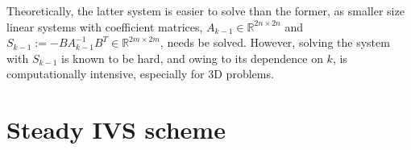 \documentclass[3p]{elsarticle}
\newcommand{\DY}[1]{{\color{black}{#1}}}
\begin{document}
Theoretically, the latter system is easier to solve than the former, as smaller size linear systems with coefficient matrices, $A_{k-1} \in \mathbb{R}^{2n \times 2n}$ and $S_{k-1}:=-B A_{k-1}^{-1} B^T  \in \mathbb{R}^{2m \times 2m} $, needs be solved. However, solving the system with $S_{k-1}$ is known to be hard, and owing to its dependence on $k$, is computationally intensive, especially for 3D problems.
\section{Steady IVS scheme}\label{sec:SIVS}
\DY{In this section, we introduce an Incremental Viscosity Splitting (IVS) scheme and study its convergence properties. This approach provides an alternative numerical framework for approximating the solution.}
\end{document}
